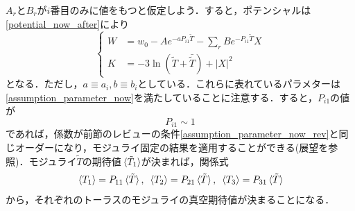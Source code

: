 \documentclass[a4paper,uplatex,dvipdfmx]{jsarticle}
\theoremstyle{definition}
\begin{document}
$A_{r}$と$B_{r}$が$i$番目のみに値をもつと仮定しよう．すると，ポテンシャルは\eqref{potential_now_after}により
\begin{equation}
   \left\{
      \begin{alignedat}{1}
         W
         &=w_{0}
         -
         A
         e^{-aP_{i1}\tilde{T}}
         -
         \sum_{r}
         B
         e^{-P_{i1}\tilde{T}}
         X
         \\
         K
         &=
         -
         3\ln(\tilde{T}+\bar{\tilde{T}})
         +
         |X|^2
      \end{alignedat}
   \right.
   \nonumber
\end{equation}
となる．ただし，$a\equiv a_{i},b\equiv b_{i}$としている．これらに表れているパラメターは\eqref{assumption_parameter_now}を満たしていることに注意する．すると，$P_{i1}$の値が
\begin{equation}
   P_{i1}
   \sim
   1
   \label{cond_P}
\end{equation}
であれば，係数が前節のレビューの条件\eqref{assumption_parameter_now_rev}と同じオーダーになり，モジュライ固定の結果を適用することができる(展望を参照)．モジュライ$\tilde{T}$の期待値$\ev*{\tilde{T}_{1}}$が決まれば，関係式
\begin{equation}
   \ev*{T_{1}}
   =
   P_{11}\ev*{\tilde{T}}
   ,\ 
   \ev*{T_{2}}
   =
   P_{21}\ev*{\tilde{T}}
   ,\ 
   \ev*{T_{3}}
   =
   P_{31}\ev*{\tilde{T}}
   \label{relation_moduli}
\end{equation}
から，それぞれのトーラスのモジュライの真空期待値が決まることになる．
\end{document}
